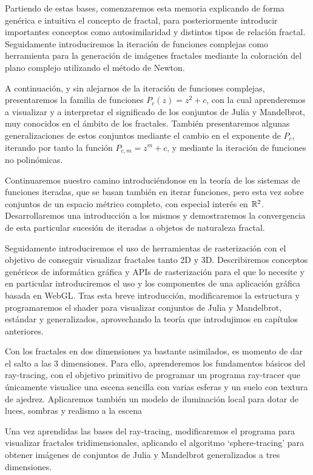 Partiendo de estas bases, comenzaremos esta memoria explicando de forma genérica e intuitiva el concepto de fractal, para posteriormente introducir importantes conceptos como autosimilaridad y distintos tipos de relación fractal. Seguidamente introduciremos la iteración de funciones complejas como herramienta para la generación de imágenes fractales mediante la coloración del plano complejo utilizando el método de Newton.

A continuación, y sin alejarnos de la iteración de funciones complejas, presentaremos la familia de funciones $P_c(z)=z^2+c$, con la cual aprenderemos a visualizar y a interpretar el significado de los conjuntos de Julia y Mandelbrot, muy conocidos en el ámbito de los fractales. También presentaremos algunas generalizaciones de estos conjuntos mediante el cambio en el exponente de $P_c$, iterando por tanto la función $P_{c,m}=z^m+c$, y mediante la iteración de funciones no polinómicas.

Continuaremos nuestro camino introduciéndonos en la teoría de los sistemas de funciones iteradas, que se basan también en iterar funciones, pero esta vez sobre conjuntos de un espacio métrico completo, con especial interés en $\mathbb{R}^2$. Desarrollaremos una introducción a los mismos y demostraremos la convergencia de esta particular sucesión de iteradas a objetos de naturaleza fractal.

Seguidamente introduciremos el uso de herramientas de rasterización con el objetivo de conseguir visualizar fractales tanto 2D y 3D. Describiremos conceptos genéricos de informática gráfica y APIs de rasterización para el que lo necesite y en particular introduciremos el uso y los componentes de una aplicación gráfica basada en WebGL. Tras esta breve introducción, modificaremos la estructura y programaremos el shader para visualizar conjuntos de Julia y Mandelbrot, estándar y generalizados, aprovechando la teoría que introdujimos en capítulos anteriores.

Con los fractales en dos dimensiones ya bastante asimilados, es momento de dar el salto a las 3 dimensiones. Para ello, aprenderemos los fundamentos básicos del ray-tracing, con el objetivo primitivo de programar un programa ray-tracer que únicamente visualice una escena sencilla con varias esferas y un suelo con textura de ajedrez. Aplicaremos también un modelo de iluminación local para dotar de luces, sombras y realismo a la escena

Una vez aprendidas las bases del ray-tracing, modificaremos el programa para visualizar fractales tridimensionales, aplicando el algoritmo `sphere-tracing' para obtener imágenes de conjuntos de Julia y Mandelbrot generalizados a tres dimensiones.


